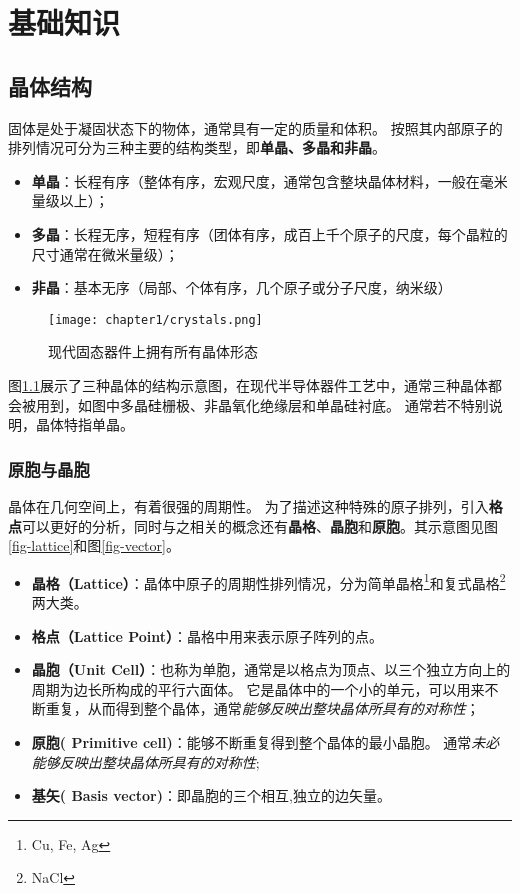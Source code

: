 
\chapter{基础知识}

\section{晶体结构}
固体是处于凝固状态下的物体，通常具有一定的质量和体积。
按照其内部原子的排列情况可分为三种主要的结构类型，即\textbf{单晶、多晶和非晶}。
\begin{itemize}
    \item \textbf{单晶}：长程有序（整体有序，宏观尺度，通常包含整块晶体材料，一般在毫米量级以上）；
    \item \textbf{多晶}：长程无序，短程有序（团体有序，成百上千个原子的尺度，每个晶粒的尺寸通常在微米量级）；
    \item \textbf{非晶}：基本无序（局部、个体有序，几个原子或分子尺度，纳米级）
\end{itemize}

\begin{figure}[hbt]
  \centering
  \texttt{[image: chapter1/crystals.png]}
  \caption{现代固态器件上拥有所有晶体形态}
  \label{fig-crystals}
\end{figure}

图\ref{fig-crystals}展示了三种晶体的结构示意图，在现代半导体器件工艺中，通常三种晶体都会被用到，如图中多晶硅栅极、非晶氧化绝缘层和单晶硅衬底。
通常若不特别说明，晶体特指单晶。

\subsection{原胞与晶胞}
晶体在几何空间上，有着很强的周期性。
为了描述这种特殊的原子排列，引入\textbf{格点}可以更好的分析，同时与之相关的概念还有\textbf{晶格}、\textbf{晶胞}和\textbf{原胞}。其示意图见图\ref{fig-lattice}和图\ref{fig-vector}。
\begin{itemize}
    \item \textbf{晶格（Lattice）}：晶体中原子的周期性排列情况，分为简单晶格\footnote{Cu, Fe, Ag}和复式晶格\footnote{NaCl}两大类。
    \item \textbf{格点（Lattice Point）}：晶格中用来表示原子阵列的点。
    \item \textbf{晶胞（Unit Cell）}：也称为单胞，通常是以格点为顶点、以三个独立方向上的周期为边长所构成的平行六面体。
    它是晶体中的一个小的单元，可以用来不断重复，从而得到整个晶体，通常\emph{能够反映出整块晶体所具有的对称性}；
    \item \textbf{原胞( Primitive cell)}：能够不断重复得到整个晶体的最小晶胞。
    通常\emph{未必能够反映出整块晶体所具有的对称性};
    \item \textbf{基矢( Basis vector)}：即晶胞的三个相互,独立的边矢量。
\end{itemize}

